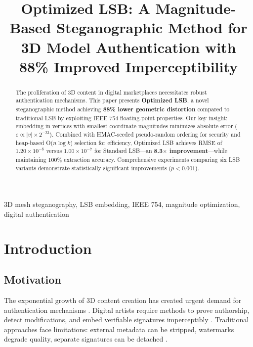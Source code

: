 \documentclass[conference]{IEEEtran}
\begin{document}
\title{Optimized LSB: A Magnitude-Based Steganographic Method for 3D Model Authentication with 88\% Improved Imperceptibility}

\author{
}

\maketitle

\begin{abstract}
The proliferation of 3D content in digital marketplaces necessitates robust authentication mechanisms. This paper presents \textbf{Optimized LSB}, a novel steganographic method achieving \textbf{88\% lower geometric distortion} compared to traditional LSB by exploiting IEEE 754 floating-point properties. Our key insight: embedding in vertices with smallest coordinate magnitudes minimizes absolute error ($\varepsilon \propto |v| \times 2^{-23}$). Combined with HMAC-seeded pseudo-random ordering for security and heap-based O($n \log k$) selection for efficiency, Optimized LSB achieves RMSE of $1.20 \times 10^{-8}$ versus $1.00 \times 10^{-7}$ for Standard LSB---an \textbf{8.3$\times$ improvement}---while maintaining 100\% extraction accuracy. Comprehensive experiments comparing six LSB variants demonstrate statistically significant improvements ($p < 0.001$).
\end{abstract}

\begin{IEEEkeywords}
3D mesh steganography, LSB embedding, IEEE 754, magnitude optimization, digital authentication
\end{IEEEkeywords}

\section{Introduction}

\subsection{Motivation}
The exponential growth of 3D content creation has created urgent demand for authentication mechanisms \cite{corsini2007watermarked}. Digital artists require methods to prove authorship, detect modifications, and embed verifiable signatures imperceptibly \cite{benedens2000towards}. Traditional approaches face limitations: external metadata can be stripped, watermarks degrade quality, separate signatures can be detached \cite{wang2008comprehensive}.
\end{document}
